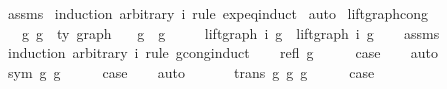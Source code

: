 \begin{isabellebody}
\ assms\isanewline
{}\isamarkupfalse%
\ {\isacharparenleft}{\kern0pt}induction\ arbitrary{\isacharcolon}{\kern0pt}\ i\ rule{\isacharcolon}{\kern0pt}\ expeq{\isachardot}{\kern0pt}induct{\isacharparenright}{\kern0pt}\isanewline
{}\isamarkupfalse%
\ auto%
\endisatagproof
{\isafoldproof}%
%
\isadelimproof
\isanewline
%
\endisadelimproof
\isanewline
\isanewline
{}\isamarkupfalse%
\ lift{\isacharunderscore}{\kern0pt}graph{\isacharunderscore}{\kern0pt}cong{\isacharcolon}{\kern0pt}\isanewline
\ \ \ g{}\ g{}\ {\isacharcolon}{\kern0pt}{\isacharcolon}{\kern0pt}\ {\isachardoublequoteopen}{\isacharprime}{\kern0pt}ty\ graph{\isachardoublequoteclose}\isanewline
\ \ \ {\isachardoublequoteopen}g{}\ {\isasymsimeq}\ g{}{\isachardoublequoteclose}\isanewline
\ \ \ \ \ {\isachardoublequoteopen}lift{\isacharunderscore}{\kern0pt}graph\ i\ g{}\ {\isasymsimeq}\ lift{\isacharunderscore}{\kern0pt}graph\ i\ g{}{\isachardoublequoteclose}\isanewline
%
\isadelimproof
\ \ %
\endisadelimproof
%
\isatagproof
{}\isamarkupfalse%
\ assms\isanewline
{}\isamarkupfalse%
\ {\isacharparenleft}{\kern0pt}induction\ arbitrary{\isacharcolon}{\kern0pt}\ i\ rule{\isacharcolon}{\kern0pt}\ gcong{\isachardot}{\kern0pt}induct{\isacharparenright}{\kern0pt}\isanewline
\ \ \isamarkupfalse%
\ {\isacharparenleft}{\kern0pt}refl\ g{\isacharparenright}{\kern0pt}\isanewline
\ \ \isamarkupfalse%
\ \isamarkupfalse%
\ {\isacharquery}{\kern0pt}case\isanewline
\ \ \isamarkupfalse%
\ auto\isanewline
\ \ \isamarkupfalse%
\isanewline
{}\isamarkupfalse%
\isanewline
\ \ \isamarkupfalse%
\ {\isacharparenleft}{\kern0pt}sym\ g{}\ g{}{\isacharparenright}{\kern0pt}\isanewline
\ \ \isamarkupfalse%
\ \isamarkupfalse%
\ {\isacharquery}{\kern0pt}case\isanewline
\ \ \isamarkupfalse%
\ auto\isanewline
\ \ \isamarkupfalse%
\isanewline
{}\isamarkupfalse%
\isanewline
\ \ \isamarkupfalse%
\ {\isacharparenleft}{\kern0pt}trans\ g{}\ g{}\ g{}{\isacharparenright}{\kern0pt}\isanewline
\ \ \isamarkupfalse%
\ \isamarkupfalse%
\ {\isacharquery}{\kern0pt}case\isanewline

\end{isabellebody}
